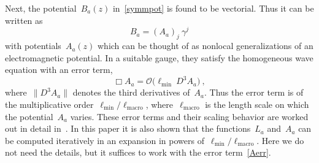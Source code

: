 \documentclass[reqno,11pt]{amsart}
\numberwithin{equation}{section}
\newcommand{\beq}{\begin{equation}}
\newcommand{\eeq}{\end{equation}}
\newcommand{\1}{\mathds{1}}
\renewcommand{\O}{{\mathscr{O}}}
\begin{document}
Next, the potential~$B_a(z)$ in~\eqref{symmpot} is found to be vectorial. Thus it can be written as
\beq \label{Bavec}
B_a = (A_a)_j\: \gamma^j
\eeq
with potentials~$A_a(z)$ which can be thought of as nonlocal generalizations of an electromagnetic potential.
In a suitable gauge, they satisfy the homogeneous wave equation with an error term,
\beq \label{Aerr}
\Box A_a = \O \big( \ell_{\min} \:D^3 A_a \big) \:,
\eeq
where~$\|D^3A_a\|$ denotes the third derivatives of~$A_a$. Thus the error term is of the 
multiplicative order~$\ell_{\min}/\ell_\text{macro}$, where~$\ell_\text{macro}$ is the length scale
on which the potential~$A_a$ varies. These error terms and their scaling behavior are worked out
in detail in~\cite{nonlocal}. In this paper it is also shown that the functions~$L_a$ and~$A_a$ can
be computed iteratively in an expansion in powers of~$\ell_{\min}/\ell_\text{macro}$.
Here we do not need the details, but it suffices to work with the error term~\eqref{Aerr}.
\end{document}
